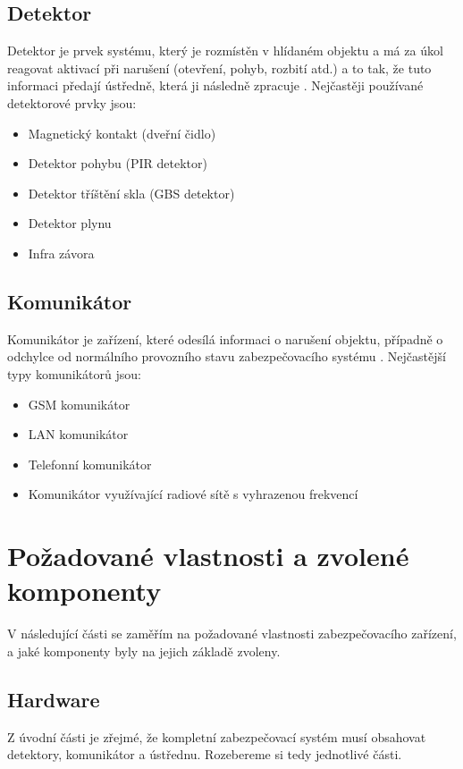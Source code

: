 \documentclass[FM,DP]{tulthesis}  %
\begin{document}
\section{Detektor}
Detektor je prvek systému, který je rozmístěn v hlídaném objektu a má za úkol reagovat aktivací při narušení (otevření, pohyb, rozbití atd.) a to tak, že tuto informaci předají ústředně, která ji následně zpracuje \cite{Electronic security signalisation}. Nejčastěji používané detektorové prvky jsou:

\begin{itemize}
\item Magnetický kontakt (dveřní čidlo)
\item Detektor pohybu (PIR detektor)
\item Detektor tříštění skla (GBS detektor)
\item Detektor plynu
\item Infra závora
\end{itemize} 

\section{Komunikátor}
Komunikátor je zařízení, které odesílá informaci o narušení objektu, případně o odchylce od normálního provozního stavu zabezpečovacího systému \cite{Electronic security signalisation}. Nejčastější typy komunikátorů jsou:

\begin{itemize}
\item GSM komunikátor
\item LAN komunikátor
\item Telefonní komunikátor
\item Komunikátor využívající radiové sítě s vyhrazenou frekvencí
\end{itemize} 


\chapter{Požadované vlastnosti a zvolené komponenty}
V následující části se zaměřím na požadované vlastnosti zabezpečovacího zařízení, a jaké komponenty byly na jejich základě zvoleny.

\section{Hardware}
Z úvodní části je zřejmé, že kompletní zabezpečovací systém musí obsahovat detektory, komunikátor a ústřednu. Rozebereme si tedy jednotlivé části.
\end{document}
